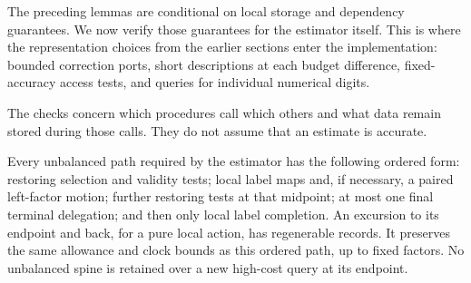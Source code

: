 The preceding lemmas are conditional on local storage and dependency guarantees. We now verify those guarantees for the estimator itself. This is where the representation choices from the earlier sections enter the implementation: bounded correction ports, short descriptions at each budget difference, fixed-accuracy access tests, and queries for individual numerical digits.

The checks concern which procedures call which others and what data remain stored during those calls. They do not assume that an estimate is accurate.

\begin{lemma}\label{lem:ctrl-paths}
Every unbalanced path required by the estimator has the following
ordered form: restoring selection and validity tests; local label maps
and, if necessary, a paired left-factor motion; further restoring tests
at that midpoint; at most one final terminal delegation; and then only
local label completion.  An excursion to its endpoint and back, for a
pure local action, has regenerable records.  It preserves the same
allowance and clock bounds as this ordered path, up to fixed factors.
No unbalanced spine is retained over a new high-cost query at its
endpoint.
\end{lemma}


